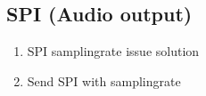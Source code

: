 \subsection{SPI (Audio output)}

\begin{enumerate}
  \item SPI samplingrate issue
  \subitem solution
  \item Send SPI with samplingrate
\end{enumerate}